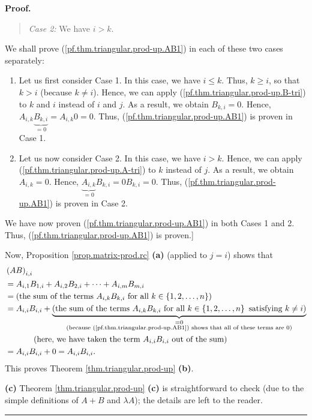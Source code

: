 \documentclass[numbers=enddot,12pt,final,onecolumn,notitlepage]{scrartcl}%
\theoremstyle{definition}
\newenvironment{statement}{\begin{quote}}{\end{quote}}
\newenvironment{proof}[1][Proof]{\noindent\textbf{#1.} }{\ \rule{0.5em}{0.5em}}
\begin{document}
\begin{proof}
\begin{statement}
\textit{Case 2:} We have $i>k$.
\end{statement}

We shall prove (\ref{pf.thm.triangular.prod-up.AB1}) in each of these two
cases separately:

\begin{enumerate}
\item Let us first consider Case 1. In this case, we have $i\leq k$. Thus,
$k\geq i$, so that $k>i$ (because $k\neq i$). Hence, we can apply
(\ref{pf.thm.triangular.prod-up.B-tri}) to $k$ and $i$ instead of $i$ and $j$.
As a result, we obtain $B_{k,i}=0$. Hence, $A_{i,k}\underbrace{B_{k,i}}%
_{=0}=A_{i,k}0=0$. Thus, (\ref{pf.thm.triangular.prod-up.AB1}) is proven in
Case 1.

\item Let us now consider Case 2. In this case, we have $i>k$. Hence, we can
apply (\ref{pf.thm.triangular.prod-up.A-tri}) to $k$ instead of $j$. As a
result, we obtain $A_{i,k}=0$. Hence, $\underbrace{A_{i,k}}_{=0}%
B_{k,i}=0B_{k,i}=0$. Thus, (\ref{pf.thm.triangular.prod-up.AB1}) is proven in
Case 2.
\end{enumerate}

We have now proven (\ref{pf.thm.triangular.prod-up.AB1}) in both Cases 1 and
2. Thus, (\ref{pf.thm.triangular.prod-up.AB1}) is proven.]

Now, Proposition \ref{prop.matrix-prod.rc} \textbf{(a)} (applied to $j=i$)
shows that%
\begin{align*}
&  \left(  AB\right)  _{i,i}\\
&  =A_{i,1}B_{1,i}+A_{i,2}B_{2,i}+\cdots+A_{i,m}B_{m,i}\\
&  =\left(  \text{the sum of the terms }A_{i,k}B_{k,i}\text{ for all }%
k\in\left\{  1,2,\ldots,n\right\}  \right) \\
&  =A_{i,i}B_{i,i}+\underbrace{\left(  \text{the sum of the terms }%
A_{i,k}B_{k,i}\text{ for all }k\in\left\{  1,2,\ldots,n\right\}  \text{
satisfying }k\neq i\right)  }_{\substack{=0\\\text{(because
(\ref{pf.thm.triangular.prod-up.AB1}) shows that all of these terms are
}0\text{)}}}\\
&  \ \ \ \ \ \ \ \ \ \ \left(  \text{here, we have taken the term }%
A_{i,i}B_{i,i}\text{ out of the sum}\right) \\
&  =A_{i,i}B_{i,i}+0=A_{i,i}B_{i,i}.
\end{align*}
This proves Theorem \ref{thm.triangular.prod-up} \textbf{(b)}.

\textbf{(c)} Theorem \ref{thm.triangular.prod-up} \textbf{(c)} is
straightforward to check (due to the simple definitions of $A+B$ and $\lambda
A$); the details are left to the reader.
\end{proof}
\end{document}
